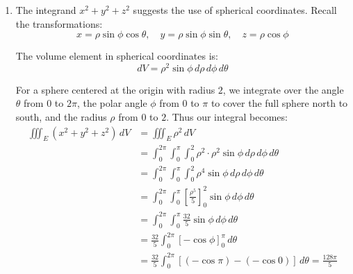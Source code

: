 \begin{example}
\begin{solution}
\begin{enumerate}
    \[
    \frac{R(z)}{r} = \frac{h-z}{h}
    \]
    
\noindent Solving for $R(z)$, we get $R(z) = \frac{r}{h}(h-z)$. This equation shows that the radius decreases linearly as we move up the cone, becoming zero at the top ($z = h$) and equal to $r$ at the base ($z = 0$). In cylindrical coordinates, we integrate over the angle $\theta$ from $0$ to $2\pi$ as it sweeps around the $xy$-plane, the height $z$ from $0$ to $h$, and for each fixed $z$, the radius $\rho$ from $0$ to $R(z) = \frac{r}{h}(h-z)$:
    
    \begin{align*}
    V &= \iiint_E 1\,dV = \int_0^{2\pi}\int_0^h\int_0^{r(h-z)/h} \rho\,d\rho\,dz\,d\theta \\[1ex]
    &= \int_0^{2\pi}\int_0^h \left[\frac{\rho^2}{2}\right]_0^{r(h-z)/h}\,dz\,d\theta \\[1ex]
    &= \int_0^{2\pi}\int_0^h \frac{r^2(h-z)^2}{2h^2}\,dz\,d\theta \\[1ex]
    &= 2\pi\int_0^h \frac{r^2(h-z)^2}{2h^2}\,dz \\[1ex]
    &= \frac{\pi r^2}{h^2}\int_0^h (h-z)^2\,dz \\[1ex]
    &= \frac{\pi r^2}{h^2}\left[-\frac{(h-z)^3}{3}\right]_0^h \\[1ex]
    &= \frac{\pi r^2}{h^2}\left[0 - \left(-\frac{h^3}{3}\right)\right] = \frac{1}{3}\pi r^2h
    \end{align*}
   \item The integrand $x^2 + y^2 + z^2$ suggests the use of spherical coordinates. Recall the transformations:
   \[
   x = \rho\sin\phi\cos\theta, \quad y = \rho\sin\phi\sin\theta, \quad z = \rho\cos\phi
   \]
   
   The volume element in spherical coordinates is:
   \[
   dV = \rho^2\sin\phi\,d\rho\,d\phi\,d\theta
   \]
   
   \noindent For a sphere centered at the origin with radius $2$, we integrate over the angle $\theta$ from $0$ to $2\pi$, the polar angle $\phi$ from $0$ to $\pi$ to cover the full sphere north to south, and the radius $\rho$ from $0$ to $2$. Thus our integral becomes:
   \begin{align*}
   \iiint_E (x^2 + y^2 + z^2)\,dV &= \iiint_E \rho^2\,dV \\[1ex]
   &= \int_0^{2\pi}\int_0^{\pi}\int_0^2 \rho^2 \cdot \rho^2\sin\phi\,d\rho\,d\phi\,d\theta \\[1ex]
   &= \int_0^{2\pi}\int_0^{\pi}\int_0^2 \rho^4\sin\phi\,d\rho\,d\phi\,d\theta \\[1ex]
   &= \int_0^{2\pi}\int_0^{\pi}\left[\frac{\rho^5}{5}\right]_0^2\sin\phi\,d\phi\,d\theta \\[1ex]
   &= \int_0^{2\pi}\int_0^{\pi}\frac{32}{5}\sin\phi\,d\phi\,d\theta \\[1ex]
   &= \frac{32}{5}\int_0^{2\pi}[-\cos\phi]_0^{\pi}\,d\theta \\[1ex]
   &= \frac{32}{5}\int_0^{2\pi}[(-\cos\pi) - (-\cos 0)]\,d\theta = \frac{128\pi}{5}
   \end{align*}
\end{enumerate}
\end{solution}
\end{example}
